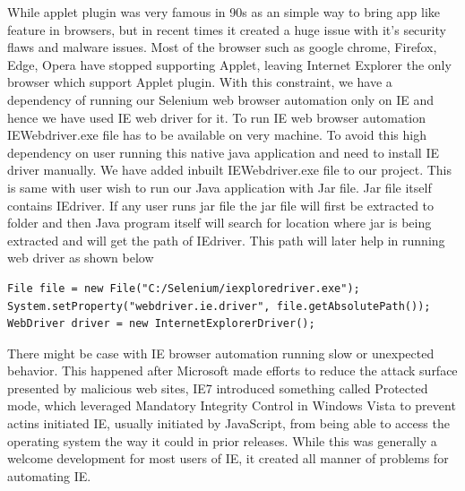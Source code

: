 \documentclass[article,type=msc,colorback,accentcolor=tud9c,twoside,11pt]{tudthesis}
\begin{document}
While applet plugin was very famous in 90s as an simple way to bring app like feature in browsers, but in recent times it created a huge issue with it's security flaws and malware issues. Most of the browser such as google chrome, Firefox, Edge, Opera have stopped supporting Applet, leaving Internet Explorer the only browser which support Applet plugin.
With this constraint, we have a dependency of running our Selenium web browser automation only on IE and hence we have used IE web driver for it. To run IE web browser automation IEWebdriver.exe file has to be available on very machine. To avoid this high dependency on user running this native java application and need to install IE driver manually. We have added inbuilt IEWebdriver.exe file to our project. This is same with user wish to run our Java application with Jar file. Jar file itself contains IEdriver. If any user runs jar file the jar file will first be extracted to folder and then Java program itself will search for location where jar is being extracted and will get the path of IEdriver. This path will later help in running web driver as shown below
\begin{lstlisting}
File file = new File("C:/Selenium/iexploredriver.exe");
System.setProperty("webdriver.ie.driver", file.getAbsolutePath());
WebDriver driver = new InternetExplorerDriver();
\end{lstlisting}
There might be case with IE browser automation running slow or unexpected behavior. This happened after Microsoft made efforts to reduce the attack surface presented by malicious web sites, IE7 introduced something called Protected mode, which leveraged Mandatory Integrity Control in Windows Vista to prevent actins initiated IE, usually initiated by JavaScript, from being able to access the operating system the way it could in prior releases. While this was generally a welcome development for most users of IE, it created all manner of problems for automating IE.
\end{document}

